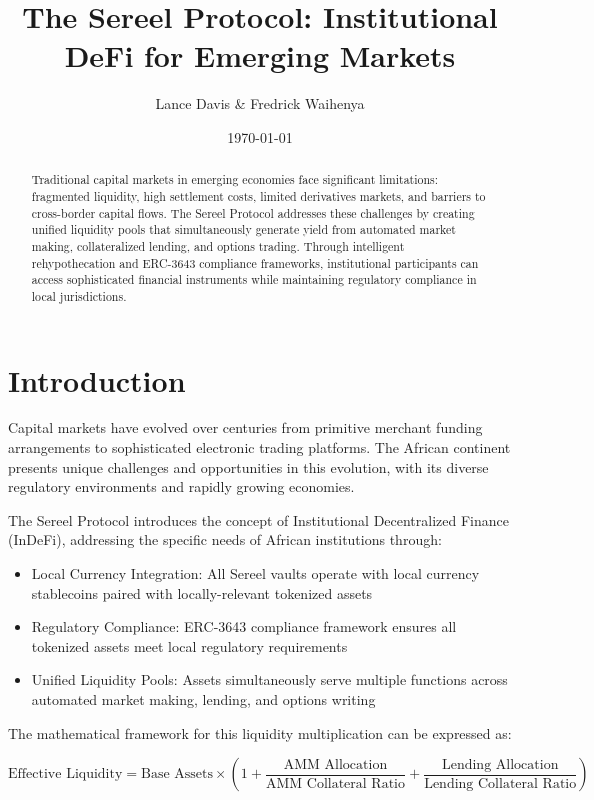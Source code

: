 \documentclass[12pt]{article}
\title{The Sereel Protocol: Institutional DeFi for Emerging Markets}
\author{Lance Davis \& Fredrick Waihenya}
\date{\today}
\begin{document}
\maketitle

\begin{abstract}
Traditional capital markets in emerging economies face significant limitations: fragmented liquidity, high settlement costs, limited derivatives markets, and barriers to cross-border capital flows. The Sereel Protocol addresses these challenges by creating unified liquidity pools that simultaneously generate yield from automated market making, collateralized lending, and options trading. Through intelligent rehypothecation and ERC-3643 compliance frameworks, institutional participants can access sophisticated financial instruments while maintaining regulatory compliance in local jurisdictions.
\end{abstract}

\section{Introduction}

Capital markets have evolved over centuries from primitive merchant funding arrangements to sophisticated electronic trading platforms. The African continent presents unique challenges and opportunities in this evolution, with its diverse regulatory environments and rapidly growing economies.

The Sereel Protocol introduces the concept of Institutional Decentralized Finance (InDeFi), addressing the specific needs of African institutions through:

\begin{itemize}
  \item Local Currency Integration: All Sereel vaults operate with local currency stablecoins paired with locally-relevant tokenized assets
  \item Regulatory Compliance: ERC-3643 compliance framework ensures all tokenized assets meet local regulatory requirements
  \item Unified Liquidity Pools: Assets simultaneously serve multiple functions across automated market making, lending, and options writing
\end{itemize}

The mathematical framework for this liquidity multiplication can be expressed as:

$$\text{Effective Liquidity} = \text{Base Assets} \times \left(1 + \frac{\text{AMM Allocation}}{\text{AMM Collateral Ratio}} + \frac{\text{Lending Allocation}}{\text{Lending Collateral Ratio}}\right)$$
\end{document}
